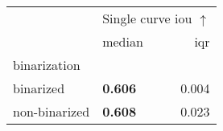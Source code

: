 \begin{tabular}{llr}
\toprule
 & \multicolumn{2}{c}{Single curve \acrshort{iou} $\uparrow$} \\
 & median & \acrshort{iqr} \\
binarization &  &  \\
\midrule
binarized & \textbf{0.606} & 0.004 \\
non-binarized & \textbf{0.608} & 0.023 \\
\bottomrule
\end{tabular}
